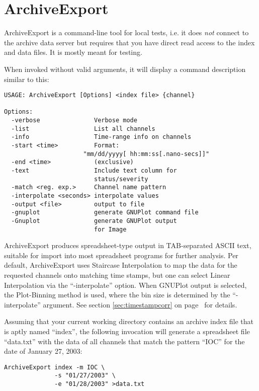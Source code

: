 \section{ArchiveExport}
ArchiveExport is a command-line tool for local tests, i.e. it does
\emph{not} connect to the archive data server but requires that
you have direct read access to the index and data files.
It is mostly meant for testing.

When invoked without valid arguments, it will display a command
description similar to this:

\begin{lstlisting}[frame=none,keywordstyle=\sffamily]
USAGE: ArchiveExport [Options] <index file> {channel}
 
Options:
  -verbose               Verbose mode
  -list                  List all channels
  -info                  Time-range info on channels
  -start <time>          Format:
                      "mm/dd/yyyy[ hh:mm:ss[.nano-secs]]"
  -end <time>            (exclusive)
  -text                  Include text column for
                         status/severity
  -match <reg. exp.>     Channel name pattern
  -interpolate <seconds> interpolate values
  -output <file>         output to file
  -gnuplot               generate GNUPlot command file
  -Gnuplot               generate GNUPlot output
                         for Image
\end{lstlisting}

\noindent ArchiveExport produces spreadsheet-type output in
TAB-separated ASCII text, suitable for import into most spreadsheet
programs for further analysis. Per default, ArchiveExport uses
Staircase Interpolation to map the data for the requested channels
onto matching time stamps, but one can select Linear Interpolation via
the ``-interpolate'' option. When GNUPlot output is selected, the
Plot-Binning method is used, where the bin size is determined by the
``-interpolate'' argument. See section \ref{sec:timestampcorr} on
page~\pageref{sec:timestampcorr} for details.

Assuming that your current working directory contains an
archive index file that is aptly named ``index'', the following
invocation will generate a spreadsheet file ``data.txt'' with the data
of all channels that match the pattern ``IOC'' for the date of January
27, 2003:

\begin{lstlisting}[frame=none,keywordstyle=\sffamily]
ArchiveExport index -m IOC \
              -s "01/27/2003" \
              -e "01/28/2003" >data.txt
\end{lstlisting}

